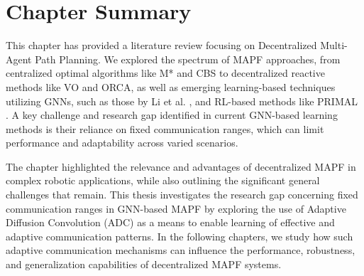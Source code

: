 \section{Chapter Summary}
This chapter has provided a literature review focusing on Decentralized Multi-Agent Path Planning. We explored the spectrum of MAPF approaches, from centralized optimal algorithms like M* and CBS to decentralized reactive methods like VO and ORCA, as well as emerging learning-based techniques utilizing GNNs, such as those by Li et al. \cite{Li2021GNNCoordination}, and RL-based methods like PRIMAL \cite{Sartoretti2019Primal}. A key challenge and research gap identified in current GNN-based learning methods is their reliance on fixed communication ranges, which can limit performance and adaptability across varied scenarios.

The chapter highlighted the relevance and advantages of decentralized MAPF in complex robotic applications, while also outlining the significant general challenges that remain. This thesis investigates the research gap concerning fixed communication ranges in GNN-based MAPF by exploring the use of Adaptive Diffusion Convolution (ADC) \cite{Zhao2021ADC} as a means to enable learning of effective and adaptive communication patterns. In the following chapters, we study how such adaptive communication mechanisms can influence the performance, robustness, and generalization capabilities of decentralized MAPF systems.